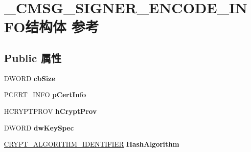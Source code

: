 \hypertarget{struct___c_m_s_g___s_i_g_n_e_r___e_n_c_o_d_e___i_n_f_o}{}\section{\+\_\+\+C\+M\+S\+G\+\_\+\+S\+I\+G\+N\+E\+R\+\_\+\+E\+N\+C\+O\+D\+E\+\_\+\+I\+N\+F\+O结构体 参考}
\label{struct___c_m_s_g___s_i_g_n_e_r___e_n_c_o_d_e___i_n_f_o}
\subsection*{Public 属性}
\begin{DoxyCompactItemize}
\item 
\mbox{\label{struct___c_m_s_g___s_i_g_n_e_r___e_n_c_o_d_e___i_n_f_o_a7a978d95b455d5effcaf0d5e465f55cd}} 
D\+W\+O\+RD {\bfseries cb\+Size}
\item 
\mbox{\label{struct___c_m_s_g___s_i_g_n_e_r___e_n_c_o_d_e___i_n_f_o_af6c754106c88f89db64605d282b2f018}} 
\hyperlink{struct___c_e_r_t___i_n_f_o}{P\+C\+E\+R\+T\+\_\+\+I\+N\+FO} {\bfseries p\+Cert\+Info}
\item 
\mbox{\label{struct___c_m_s_g___s_i_g_n_e_r___e_n_c_o_d_e___i_n_f_o_a7c524ea9bbd64e2b42c4319c8665d903}} 
H\+C\+R\+Y\+P\+T\+P\+R\+OV {\bfseries h\+Crypt\+Prov}
\item 
\mbox{\label{struct___c_m_s_g___s_i_g_n_e_r___e_n_c_o_d_e___i_n_f_o_a17339fcca2a2087c5a283c80d697c107}} 
D\+W\+O\+RD {\bfseries dw\+Key\+Spec}
\item 
\mbox{\label{struct___c_m_s_g___s_i_g_n_e_r___e_n_c_o_d_e___i_n_f_o_a36c1e001b82d925390ffd8713f5c6d04}} 
\hyperlink{struct___c_r_y_p_t___a_l_g_o_r_i_t_h_m___i_d_e_n_t_i_f_i_e_r}{C\+R\+Y\+P\+T\+\_\+\+A\+L\+G\+O\+R\+I\+T\+H\+M\+\_\+\+I\+D\+E\+N\+T\+I\+F\+I\+ER} {\bfseries Hash\+Algorithm}
\item 
\mbox{\label{struct___c_m_s_g___s_i_g_n_e_r___e_n_c_o_d_e___i_n_f_o_a39f3f003843b7dbac8db0cc73c17c8bb}} 

\end{DoxyCompactItemize}
